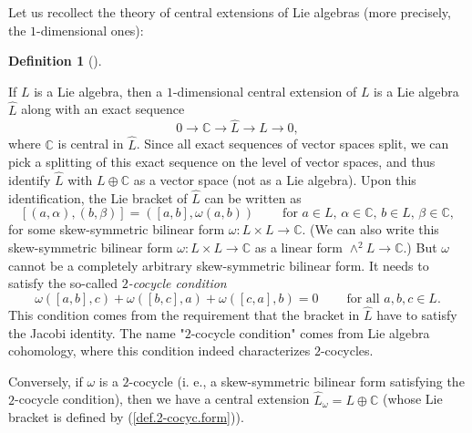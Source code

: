 \documentclass
[numbers=enddot,12pt,final,onecolumn,german,notitlepage]{scrartcl}%
\theoremstyle{definition}
\newtheorem{defi}[theo]{Definition}
\newenvironment{definition}[1][]
{\begin{defi}[#1]\begin{leftbar}}
{\end{leftbar}\end{defi}}
\begin{document}
Let us recollect the theory of central extensions of Lie algebras (more
precisely, the $1$-dimensional ones):

\begin{definition}
\label{def.centex}If $L$ is a Lie algebra, then a $1$-dimensional central
extension of $L$ is a Lie algebra $\widehat{L}$ along with an exact sequence%
\begin{equation}
0\rightarrow\mathbb{C}\rightarrow\widehat{L}\rightarrow L\rightarrow0,
\label{def.2-cocyc.es}%
\end{equation}
where $\mathbb{C}$ is central in $\widehat{L}$. Since all exact sequences of
vector spaces split, we can pick a splitting of this exact sequence on the
level of vector spaces, and thus identify $\widehat{L}$ with $L\oplus
\mathbb{C}$ as a vector space (not as a Lie algebra). Upon this
identification, the Lie bracket of $\widehat{L}$ can be written as%
\begin{equation}
\left[  \left(  a,\alpha\right)  ,\left(  b,\beta\right)  \right]  =\left(
\left[  a,b\right]  ,\omega\left(  a,b\right)  \right)
\ \ \ \ \ \ \ \ \ \ \text{for }a\in L\text{, }\alpha\in\mathbb{C}\text{, }b\in
L\text{, }\beta\in\mathbb{C}, \label{def.2-cocyc.form}%
\end{equation}
for some skew-symmetric bilinear form $\omega:L\times L\rightarrow\mathbb{C}$.
(We can also write this skew-symmetric bilinear form $\omega:L\times
L\rightarrow\mathbb{C}$ as a linear form $\wedge^{2}L\rightarrow\mathbb{C}$.)
But $\omega$ cannot be a completely arbitrary skew-symmetric bilinear form. It
needs to satisfy the so-called $2$\textit{-cocycle condition}%
\[
\omega\left(  \left[  a,b\right]  ,c\right)  +\omega\left(  \left[
b,c\right]  ,a\right)  +\omega\left(  \left[  c,a\right]  ,b\right)
=0\ \ \ \ \ \ \ \ \ \ \text{for all }a,b,c\in L.
\]
This condition comes from the requirement that the bracket in $\widehat{L}$
have to satisfy the Jacobi identity. The name "$2$-cocycle condition" comes
from Lie algebra cohomology, where this condition indeed characterizes $2$-cocycles.

Conversely, if $\omega$ is a $2$-cocycle (i. e., a skew-symmetric bilinear
form satisfying the $2$-cocycle condition), then we have a central extension
$\widehat{L}_{\omega}=L\oplus\mathbb{C}$ (whose Lie bracket is defined by
(\ref{def.2-cocyc.form})).


\end{definition}
\end{document}
